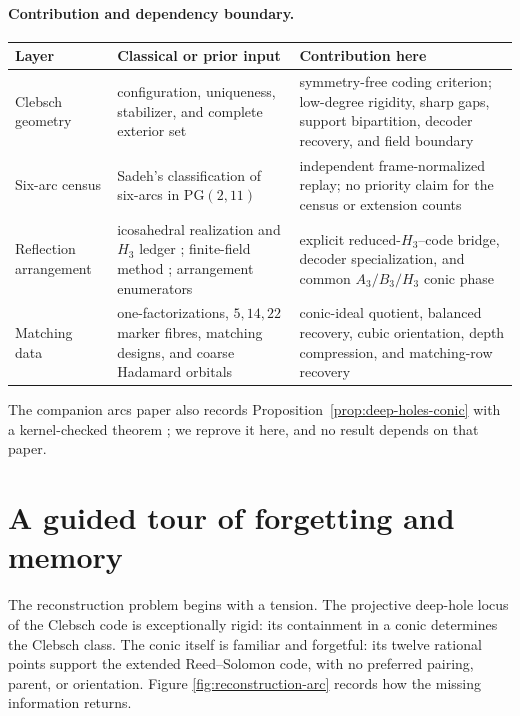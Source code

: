 \documentclass[11pt]{article}
\theoremstyle{definition}
\theoremstyle{remark}
\newcommand{\PG}{\mathrm{PG}}
\begin{document}
\paragraph{Contribution and dependency boundary.}
\begin{center}
\footnotesize
\begin{tabular}{@{}>{\raggedright\arraybackslash}p{}
                    >{\raggedright\arraybackslash}p{}
                    >{\raggedright\arraybackslash}p{}@{}}
\toprule
Layer & Classical or prior input & Contribution here\\
\midrule
Clebsch geometry
& configuration, uniqueness, stabilizer, and complete exterior set
  \cite{Clebsch1871,Edge1956,Dye1991,BSW1992,SVM1995}
& symmetry-free coding criterion; low-degree rigidity, sharp gaps,
  support bipartition, decoder recovery, and field boundary\\
Six-arc census
& Sadeh's classification of six-arcs in $\PG(2,11)$
  \cite{SadehThesis1984}
& independent frame-normalized replay; no priority claim for the census
  or extension counts\\
Reflection arrangement
& icosahedral realization and $H_3$ ledger
  \cite[\S\S19--20]{Edge1956}\cite{Calvo2024}; finite-field method
  \cite{Athanasiadis1996}; arrangement enumerators
  \cite[Prop.~3.11, Thms.~5.3, 5.7, Ex.~5.10]{JurriusPellikaan2015}
& explicit reduced-$H_3$--code bridge, decoder specialization, and common
  $A_3/B_3/H_3$ conic phase\\
Matching data
& one-factorizations, $5,14,22$ marker fibres, matching designs, and
  coarse Hadamard orbitals
& conic-ideal quotient, balanced recovery, cubic orientation, depth
  compression, and matching-row recovery\\
\bottomrule
\end{tabular}
\end{center}
The companion arcs paper also records
Proposition~\ref{prop:deep-holes-conic} with a kernel-checked theorem
\cite[Prop.~8.2]{ArcsCompleteOutsideConic}; we reprove it here, and no
result depends on that paper.

\section{A guided tour of forgetting and memory}
\label{sec:tour}

The reconstruction problem begins with a tension.  The projective
deep-hole locus of the Clebsch code is exceptionally rigid: its containment
in a conic determines the Clebsch class.  The conic itself is familiar and
forgetful: its twelve rational points support the extended Reed--Solomon
code, with no preferred pairing, parent, or orientation.  Figure
\ref{fig:reconstruction-arc} records how the missing information returns.
\end{document}
